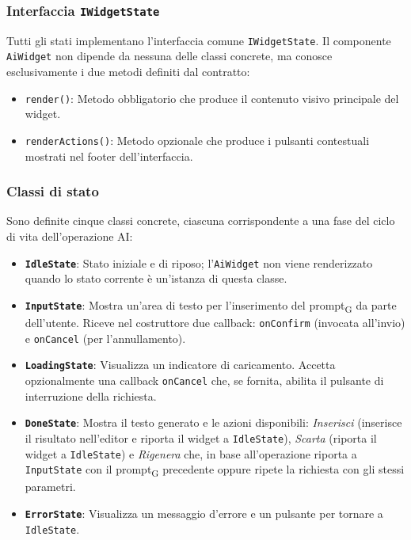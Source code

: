 \documentclass[11pt,a4paper]{article}
\newcommand{\gls}[1]{#1\textsubscript{G}}
\begin{document}
\subsubsection{Interfaccia \texttt{IWidgetState}}
Tutti gli stati implementano l'interfaccia comune \texttt{IWidgetState}. Il componente \texttt{AiWidget} non dipende da nessuna delle classi concrete, ma conosce esclusivamente i due metodi definiti dal contratto:
\begin{itemize}
    \item \texttt{render()}: Metodo obbligatorio che produce il contenuto visivo principale del widget.
    \item \texttt{renderActions()}: Metodo opzionale che produce i pulsanti contestuali mostrati nel footer dell'interfaccia.
\end{itemize}

\subsubsection{Classi di stato}
Sono definite cinque classi concrete, ciascuna corrispondente a una fase del ciclo di vita dell'operazione AI:
\begin{itemize}
    \item \textbf{\texttt{IdleState}}: Stato iniziale e di riposo; l'\texttt{AiWidget} non viene renderizzato quando lo stato corrente è un'istanza di questa classe.
    \item \textbf{\texttt{InputState}}: Mostra un'area di testo per l'inserimento del \gls{prompt} da parte dell'utente. Riceve nel costruttore due callback: \texttt{onConfirm} (invocata all'invio) e \texttt{onCancel} (per l'annullamento).
    \item \textbf{\texttt{LoadingState}}: Visualizza un indicatore di caricamento. Accetta opzionalmente una callback \texttt{onCancel} che, se fornita, abilita il pulsante di interruzione della richiesta.
    \item \textbf{\texttt{DoneState}}: Mostra il testo generato e le azioni disponibili: \textit{Inserisci} (inserisce il risultato nell'editor e riporta il widget a \texttt{IdleState}), \textit{Scarta} (riporta il widget a \texttt{IdleState}) e \textit{Rigenera} che, in base all'operazione riporta a \texttt{InputState} con il \gls{prompt} precedente oppure ripete la richiesta con gli stessi parametri.
    \item \textbf{\texttt{ErrorState}}: Visualizza un messaggio d'errore e un pulsante per tornare a \texttt{IdleState}.
\end{itemize}
\end{document}
